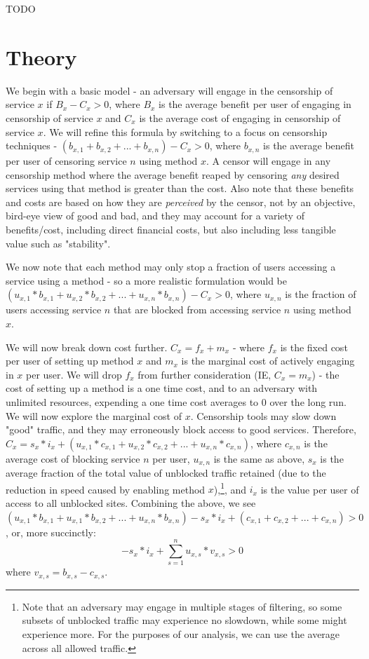 \documentclass[12pt]{report}
\begin{document}
TODO

\chapter{Theory}
\label{theory}

We begin with a basic model - an adversary will engage in the censorship of service $x$ if $B_x - C_x > 0$, where $B_x$ is the average benefit per user of engaging in censorship of service $x$ and $C_x$ is the average cost of engaging in censorship of service $x$. We will refine this formula by switching to a focus on censorship techniques - $(b_{x,1} + b_{x,2} + ... + b_{x,n}) - C_x > 0$, where $b_{x,n}$ is the average benefit per user of censoring service $n$ using method $x$. A censor will engage in any censorship method where the average benefit reaped by censoring \emph{any} desired services using that method is greater than the cost. Also note that these benefits and costs are based on how they are \emph{perceived} by the censor, not by an objective, bird-eye view of good and bad, and they may account for a variety of benefits/cost, including direct financial costs, but also including less tangible value such as "stability".

We now note that each method may only stop a fraction of users accessing a service using a method - so a more realistic formulation would be $(u_{x,1}*b_{x,1} + u_{x,2}*b_{x,2} + ... + u_{x,n}*b_{x,n}) - C_x > 0$, where $u_{x,n}$ is the fraction of users accessing service $n$ that are blocked from accessing service $n$ using method $x$.

We will now break down cost further. $C_x = f_x + m_x$ - where $f_x$ is the fixed cost per user of setting up method $x$ and $m_x$ is the marginal cost of actively engaging in $x$ per user. We will drop $f_x$ from further consideration (IE, $C_x = m_x$) - the cost of setting up a method is a one time cost, and to an adversary with unlimited resources, expending a one time cost averages to $0$ over the long run. We will now explore the marginal cost of $x$. Censorship tools may slow down "good" traffic, and they may erroneously block access to good services. Therefore, $C_x = s_x*i_x + (u_{x,1}*c_{x,1} + u_{x,2}*c_{x,2} + ...  + u_{x,n}*c_{x,n})$, where $c_{x,n}$ is the average cost of blocking service $n$ per user, $u_{x,n}$ is the same as above, $s_x$ is the average fraction of the total value of unblocked traffic retained (due to the reduction in speed caused by enabling method $x$),\footnote{Note that an adversary may engage in multiple stages of filtering, so some subsets of unblocked traffic may experience no slowdown, while some might experience more. For the purposes of our analysis, we can use the average across all allowed traffic.}, and $i_x$ is the value per user of access to all unblocked sites. Combining the above, we see
$(u_{x,1}*b_{x,1} + u_{x,1}*b_{x,2} + ... + u_{x,n}*b_{x,n}) - s_x*i_x + (c_{x,1} + c_{x,2} + ...  + c_{x,n}) > 0$, or, more succinctly:
\begin{equation}
-s_x*i_x + \sum_{s=1}^{n}u_{x,s}*v_{x,s} > 0
\end{equation}
where $v_{x,s} = b_{x,s} - c_{x,s}$.
\end{document}
